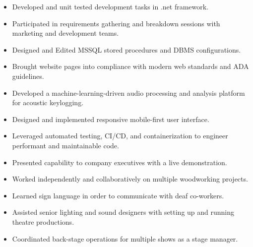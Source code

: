 \documentclass[10pt,a4paper,ragged2e,withhyper]{altacv}
\begin{document}
\divider{}

\begin{itemize}
\item Developed and unit tested development tasks in .net framework.
\item Participated in requirements gathering and breakdown sessions with marketing and development teams.
\item Designed and Edited MSSQL stored procedures and DBMS configurations.
\item Brought website pages into compliance with modern web standards and ADA guidelines.
\end{itemize}

\divider{}

\begin{itemize}
\item Developed a machine-learning-driven audio processing and analysis platform for acoustic keylogging.
\item Designed and implemented responsive mobile-first user interface.
\item Leveraged automated testing, CI/CD, and containerization to engineer performant and maintainable code.
\item Presented capability to company executives with a live demonstration.
\end{itemize}

\divider{}

\begin{itemize}
\item Worked independently and collaboratively on multiple woodworking projects.
\item Learned sign language in order to communicate with deaf co-workers.
\item Assisted senior lighting and sound designers with setting up and running theatre productions.
\item Coordinated back-stage operations for multiple shows as a stage manager.
\end{itemize}

\end{document}
